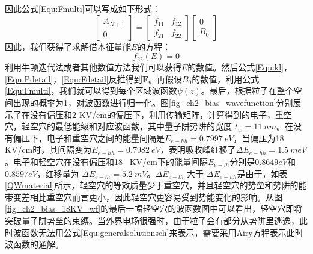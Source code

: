 因此公式\ref{Equ:Fmulti}可以写成如下形式：
\begin{equation}
\label{Equ:Fmulti}
\begin{bmatrix}
A_{N+1}\\
0
\end{bmatrix} = \begin{bmatrix}
f_{11}&f_{12}\\
f_{21}&f_{22}
\end{bmatrix}
\begin{bmatrix}
0\\
B_{0}
\end{bmatrix}
\end{equation}
因此，我们获得了求解借本征量能$E$的方程：
\begin{equation}
\label{Equ:sloveE}
f_{22}(E) = 0
\end{equation}
利用牛顿迭代法或者其他数值方法我们可以获得$E$的数值。然后公式\ref{Equ:kl}，\ref{Equ:Pdetail}，\ref{Equ:Fdetail}反推得到$\textbf{F}$。再假设$B_{0}$的数值，利用公式\ref{Equ:Fmulti}，我们就可以得到每个区域波函数$\psi(z)$。最后，根据粒子在整个空间出现的概率为1，对波函数进行归一化。图\ref{fig_ch2_bias_wavefunction}分别展示了在没有偏压和2 KV/cm的偏压下，利用传输矩阵，计算得到的电子，重空穴，轻空穴的最低能级和对应波函数，其中量子阱势阱的宽度 $t_w = 11 ~nm$。在没有偏压下，电子和重空穴之间的能量间隔是$E_{e-hh} = 0.7997 ~eV$，当偏压为18~ KV/cm时，其间隔变为$E_{e-hh} = 0.7982~eV$，表明吸收峰红移了$\Delta E_{e-hh} = 1.5 ~meV$。电子和轻空穴在没有偏压和18 ~KV/cm下的能量间隔$E_{e-lh}$分别是$0.8649 eV$和$0.8597 eV$，红移量为 $\Delta E_{e-lh} = 5.2~ mV$。$\Delta E_{e-lh}$ 大于 $\Delta E_{e-hh}$是由于，如表\ref{QWmaterial}所示，轻空穴的等效质量少于重空穴，并且轻空穴的势垒和势阱的能带变差相比重空穴而言更小，因此轻空穴更容易受到势能变化的影响。从图\ref{fig_ch2_bias_18KV_wf}的最后一幅轻空穴的波函数图中可以看出，轻空穴即将突破量子阱势垒的束缚。当外界电场很强时，由于粒子会有部分从势阱里逃逸，此时波函数无法用公式\ref{Equ:generalsolutionsch}来表示，需要采用Airy方程表示此时波函数的通解\cite{chuang1991exciton}。

